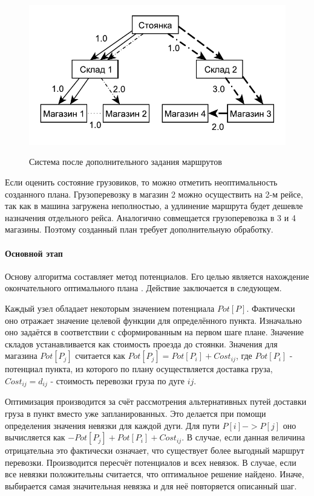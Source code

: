  	\begin{figure}[h]
	 	\begin{center}
	 		{\includegraphics[scale=1.0, angle=0]{img/max_elem_3.pdf}}
	 		\caption{Система после дополнительного задания маршрутов}
	 		\label{pic:pre_3}
	 	\end{center}
	 \end{figure}
 
 	Если оценить состояние грузовиков, то можно отметить неоптимальность созданного плана. Грузоперевозку в магазин 2 можно осуществить на 2-м рейсе, так как в машина загружена неполностью, а удлинение маршрута будет дешевле назначения отдельного рейса. Аналогично совмещается грузоперевозка в 3 и 4 магазины. Поэтому созданный план требует дополнительную обработку.
	
	\paragraph{Основной этап}
	Основу алгоритма составляет метод потенциалов. Его целью является нахождение окончательного оптимального плана \cite{potential}. Действие заключается в следующем.
	
	Каждый узел обладает некоторым значением потенциала $Pot[P]$. Фактически оно отражает значение целевой функции для определённого пункта. Изначально оно задаётся в соответствии с сформированным на первом шаге плане. Значение складов устанавливается как стоимость проезда до стоянки. Значения для магазина $Pot[P_j]$ считается как $Pot[P_j] = Pot[P_i] + Cost_{ij}$, где $Pot[P_i]$ - потенциал пункта, из которого по плану осуществляется доставка груза, $Cost_{ij} = d_{ij}$ - стоимость перевозки груза по дуге $ij$.
	
	Оптимизация производится за счёт рассмотрения альтернативных путей доставки груза в пункт вместо уже запланированных. Это делается при помощи определения значения невязки для каждой дуги. Для пути $P[i] -> P[j]$ оно вычисляется как $-Pot[P_j] + Pot[P_i] + Cost_{ij}$. В случае, если данная величина отрицательна это фактически означает, что существует более выгодный маршрут перевозки. Производится пересчёт потенциалов и всех невязок. В случае, если все невязки положительны считается, что оптимальное решение найдено. Иначе, выбирается самая значительная невязка и для неё повторяется описанный шаг.
	
